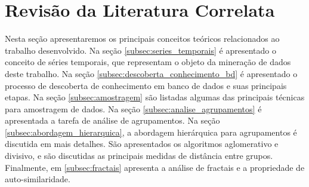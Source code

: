 \section{Revisão da Literatura Correlata} \label{sec:fundamentacao_teorica}

Nesta seção apresentaremos os principais conceitos teóricos relacionados ao
trabalho desenvolvido. Na seção \ref{subsec:series_temporais} é apresentado
o conceito de séries temporais, que representam o objeto da mineração de dados
deste trabalho. Na seção \ref{subsec:descoberta_conhecimento_bd} é
apresentado o processo de descoberta de conhecimento em banco de dados e
suas principais etapas. Na seção \ref{subsec:amostragem} são listadas
algumas das principais técnicas para amostragem de dados. Na seção
\ref{subsec:analise_agrupamentos} é apresentada a tarefa de análise de
agrupamentos. Na seção \ref{subsec:abordagem_hierarquica}, a abordagem hierárquica
para agrupamentos é discutida em mais detalhes. São apresentados os algoritmos
aglomerativo e divisivo, e são discutidas as principais medidas de distância
entre grupos. Finalmente, em \ref{subsec:fractais} apresenta a análise de 
fractais e a propriedade de auto-similaridade.










